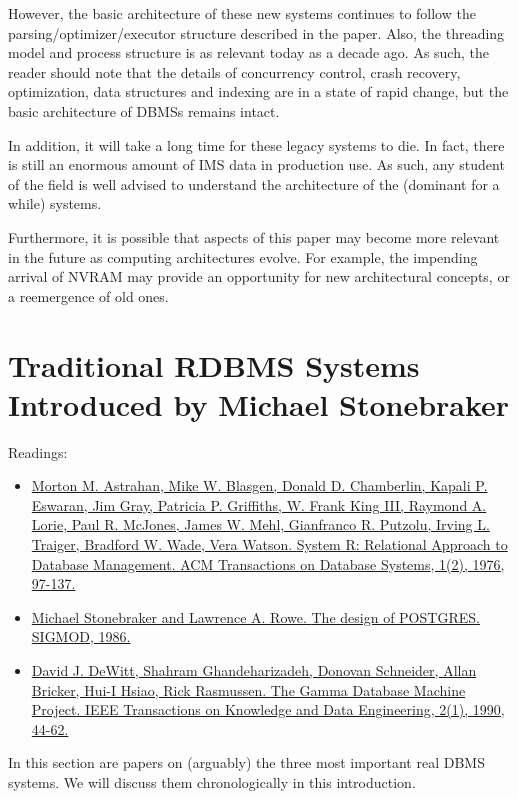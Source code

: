 \documentclass[b5paper,11pt,twoside,openright]{book}
\newcommand\Chapter[3]{
  \hypertarget{#1}{
    \chapter[#2]{#2\\{\Large #3}}\label{#1}
  }
}
\begin{document}
However, the basic architecture of these new systems continues to follow
the parsing/optimizer/executor structure described in the paper. Also,
the threading model and process structure is as relevant today as a
decade ago. As such, the reader should note that the details of
concurrency control, crash recovery, optimization, data structures and
indexing are in a state of rapid change, but the basic architecture of
DBMSs remains intact.

In addition, it will take a long time for these legacy systems to die.
In fact, there is still an enormous amount of IMS data in production
use. As such, any student of the field is well advised to understand the
architecture of the (dominant for a while) systems.

Furthermore, it is possible that aspects of this paper may become more
relevant in the future as computing architectures evolve. For example,
the impending arrival of NVRAM may provide an opportunity for new
architectural concepts, or a reemergence of old ones.


\Chapter{ch2-importantdbms}{Traditional RDBMS Systems}{%
Introduced by Michael Stonebraker
}

\begin{framed}
Readings:

\begin{itemize}
\item
\href{https://scholar.google.com/scholar?cluster=15466550502837111601}{Morton
  M. Astrahan, Mike W. Blasgen, Donald D. Chamberlin, Kapali P. Eswaran,
  Jim Gray, Patricia P. Griffiths, W. Frank King III, Raymond A. Lorie,
  Paul R. McJones, James W. Mehl, Gianfranco R. Putzolu, Irving L.
  Traiger, Bradford W. Wade, Vera Watson. {System R: Relational Approach
    to Database Management}. {ACM Transactions on Database Systems}, 1(2),
  1976, 97-137.}
\item
\href{https://scholar.google.com/scholar?cluster=7945977557090027847}{Michael
  Stonebraker and Lawrence A. Rowe. {The design of POSTGRES}. {SIGMOD},
  1986.}
\item
\href{https://scholar.google.com/scholar?cluster=8912521541627865753}{David
  J. DeWitt, Shahram Ghandeharizadeh, Donovan Schneider, Allan Bricker,
  Hui-I Hsiao, Rick Rasmussen. {The Gamma Database Machine Project}. {IEEE
    Transactions on Knowledge and Data Engineering}, 2(1), 1990, 44-62.}
\end{itemize}
\end{framed}

In this section are papers on (arguably) the three most important real
DBMS systems. We will discuss them chronologically in this introduction.
\end{document}
